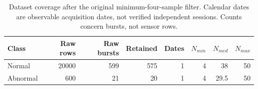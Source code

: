 \begin{table}[t]
\centering
\caption{Dataset coverage after the original minimum-four-sample filter. Calendar dates are observable acquisition dates, not verified independent sessions. Counts concern bursts, not sensor rows.}
\label{tab:dataset}
\small
\begin{tabular}{lrrrrrrr}
\toprule
Class & Raw rows & Raw bursts & Retained & Dates & $N_{min}$ & $N_{med}$ & $N_{max}$ \\
\midrule
Normal & 20000 & 599 & 575 & 1 & 4 & 38 & 50 \\
Abnormal & 600 & 21 & 20 & 1 & 4 & 29.5 & 50 \\
\bottomrule
\end{tabular}
\end{table}

